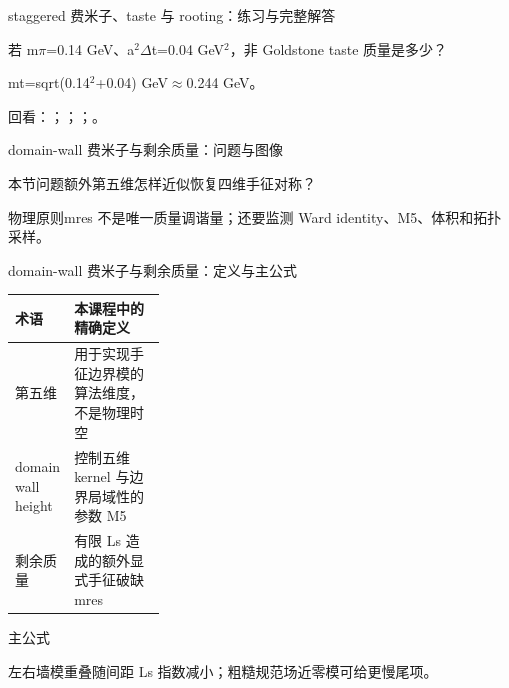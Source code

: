 \begin{frame}[t]{staggered 费米子、taste 与 rooting：练习与完整解答}
\footnotesize
\begin{block}{}若 m\ensuremath{\pi}=0.14 GeV、a\ensuremath{^{2}}\ensuremath{\Delta}t=0.04 GeV\ensuremath{^{2}}，非 Goldstone taste 质量是多少？\end{block}
\begin{exampleblock}{}mt=sqrt(0.14\ensuremath{^{2}}+0.04) GeV\ensuremath{\approx}0.244 GeV。\end{exampleblock}
\vfill
\scriptsize 回看：；；；。
\end{frame}

\begin{frame}[t]{domain-wall 费米子与剩余质量：问题与图像}
\footnotesize
\begin{block}{本节问题}额外第五维怎样近似恢复四维手征对称？\end{block}
\begin{block}{物理原则}\quad mres 不是唯一质量调谐量；还要监测 Ward identity、M5、体积和拓扑采样。\end{block}
\end{frame}

\begin{frame}[t]{domain-wall 费米子与剩余质量：定义与主公式}
\footnotesize\begin{tabularx}{\linewidth}{p{0.30\linewidth}Y}
\toprule 术语 & 本课程中的精确定义\\\midrule
{} 第五维 & 用于实现手征边界模的算法维度，不是物理时空\\
 domain wall height & 控制五维 kernel 与边界局域性的参数 M5\\
 剩余质量 & 有限 Ls 造成的额外显式手征破缺 mres\\
\bottomrule\end{tabularx}\vspace{0.15cm}
\begin{block}{ 主公式}\centering{}\end{block}
左右墙模重叠随间距 Ls 指数减小；粗糙规范场近零模可给更慢尾项。
\end{frame}

